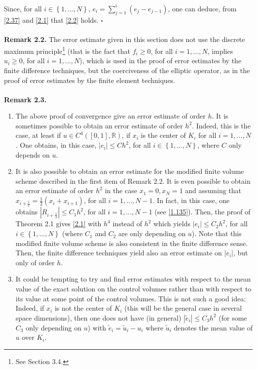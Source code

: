 \documentclass[a4paper]{article}
\numberwithin{equation}{section}
\begin{document}
Since, for all $i \in \left\{ {1, \ldots ,N} \right\}$, ${e_i} = \sum\limits_{j = 1}^i {\left( {{e_j} - {e_{j - 1}}} \right)} $, one can deduce, from \eqref{2.37} and \eqref{2.1} that \eqref{2.2} holds. \hfill $\square$\\
\\
\textbf{Remark 2.2.} The error estimate given in this section does not use the discrete maximum principle\footnote{See Section 3.4.} (that is the fact that $f_i\ge 0$, for all $i=1,\ldots,N$, implies $u_i\ge 0$, for all $i=1,\ldots,N$), which is used in the proof of error estimates by the finite difference techniques, but the coerciveness of the elliptic operator, as in the proof of error estimates by the finite element techniques.\\
\\
\textbf{Remark 2.3.} 
\begin{enumerate}
\item The above proof of convergence give an error estimate of order $h$. It is sometimes possible to obtain an error estimate of order $h^2$. Indeed, this is the case, at least if $u \in {C^4}\left( {\left[ {0,1} \right],\mathbb{R}} \right)$, if $x_i$ is the center of $K_i$ for all $i=1,\ldots,N$. One obtains, in this case, $\left| {{e_i}} \right| \le C{h^2}$, for all $i \in \left\{ {1, \ldots ,N} \right\}$, where $C$ only depends on $u$.
\item It is also possible to obtain an error estimate for the modified finite volume scheme described in the first item of Remark 2.2. It is even possible to obtain an error estimate of order $h^2$ in the case $x_1=0,x_N=1$ and assuming that ${x_{i + \frac{1}{2}}} = \frac{1}{2}\left( {{x_i} + {x_{i + 1}}} \right)$, for all $i=1,\ldots,N-1$. In fact, in this case, one obtains  $\left| {{R_{i + \frac{1}{2}}}} \right| \le {C_1}{h^2}$, for all $i=1,\ldots,N-1$ (see \eqref{1.135}). Then, the proof of Theorem 2.1 gives \eqref{2.1} with $h^4$ instead of $h^2$ which yields $\left| {{e_i}} \right| \le {C_2}{h^2}$, for all $i \in \left\{ {1, \ldots ,N} \right\}$ (where $C_1$ and $C_2$ are only depending on $u$). Note that this modified finite volume scheme is also consistent in the finite difference sense. Then, the finite difference techniques yield also an error estimate on $\left| {{e_i}} \right|$, but only of order $h$.
\item It could be tempting to try and find error estimates with respect to the mean value of the exact solution on the control volumes rather than with respect to its value at some point of the control volumes. This is not such a good idea: Indeed, if $x_i$ is not the center of $K_i$ (this will be the general case in several space dimensions), then one does not have (in general) $\left| {{{\widetilde e}_i}} \right| \le {C_3}{h^2}$ (for some $C_3$ only depending on $u$) with ${\widetilde e_i} = {\widetilde u_i} - {u_i}$ where ${\widetilde u_i}$ denotes the mean value of $u$ over $K_i$.
\end{enumerate}
\end{document}
